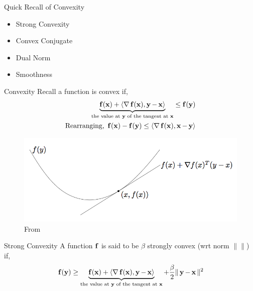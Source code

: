 

\begin{frame}{Quick Recall of Convexity}
  \begin{itemize}
  \item Strong Convexity
  \item Convex Conjugate
  \item Dual Norm
  \item Smoothness
  \end{itemize}
\end{frame}

\begin{frame}{Convexity}
  Recall a function is convex if,
  \begin{align*} 
    \underbrace{\f(\x) + \dotprod{\grad \f(\x)}{\y-\x}}_{\text{the value at $\y$ of the tangent at $\x$}} \le \f(\y) \\
    \text{Rearranging, } \f(\x)-\f(\y) \le \dotprod{\grad \f(\x)} {\x-\y} \\
  \end{align*}
  \begin{figure}
    \includegraphics[scale=0.27]{images/convexity.png}
    \caption{From \cite{BV2004}}
  \end{figure}
\end{frame}

\begin{frame}{Strong Convexity}
  A function $\f$ is said to be $\beta$ strongly convex (wrt norm $\|\|$) if,
  \begin{align*}
   & \f(\y) \ge \underbrace{\f(\x) + \dotprod{\grad \f(\x)}{\y-\x}}_{\text{the value at $\y$ of the tangent at $\x$}} + \frac{\beta}{2} \|\y-\x\|^2\\
  \end{align*}
\end{frame}

